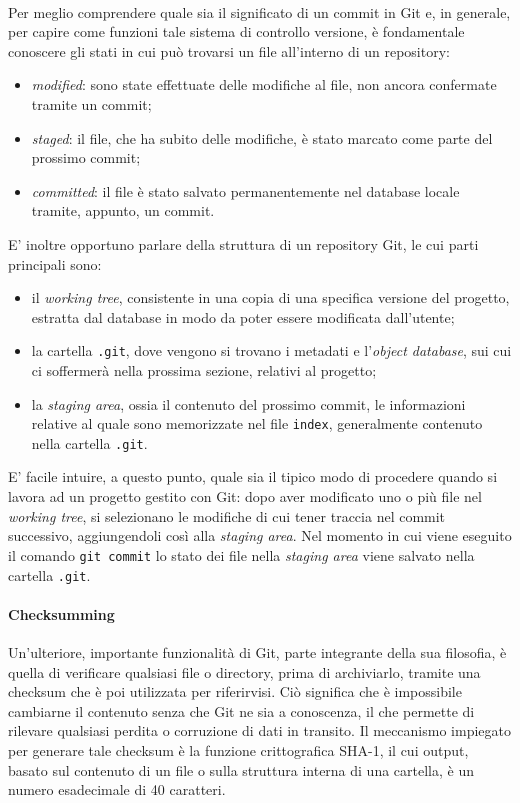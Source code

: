 \documentclass[12pt]{article}
\def\code#1{\texttt{#1}}
\begin{document}
\bigskip \\
Per meglio comprendere quale sia il significato di un commit in Git e, in generale, per capire come funzioni tale sistema di controllo versione, è fondamentale conoscere gli stati in cui può trovarsi un file all'interno di un repository:
\begin{itemize}
	\item \textit{modified}: sono state effettuate delle modifiche al file, non ancora confermate tramite un commit;
	\item \textit{staged}: il file, che ha subito delle modifiche, è stato marcato come parte del prossimo commit;
	\item \textit{committed}: il file è stato salvato permanentemente nel database locale tramite, appunto, un commit.
\end{itemize}
E' inoltre opportuno parlare della struttura di un repository Git, le cui parti principali sono:
\begin{itemize}
	\item il \textit{working tree}, consistente in una copia di una specifica versione del progetto, estratta dal database in modo da poter essere modificata dall'utente;
	\item la cartella \code{.git}, dove vengono si trovano i metadati e l'\textit{object database}, sui cui ci soffermerà nella prossima sezione, relativi al progetto;
	\item la \textit{staging area}, ossia il contenuto del prossimo commit, le informazioni relative al quale sono memorizzate nel file \code{index}, generalmente contenuto nella cartella \code{.git}. 
\end{itemize}
E' facile intuire, a questo punto, quale sia il tipico modo di procedere quando si lavora ad un progetto gestito con Git: dopo aver modificato uno o più file nel \textit{working tree}, si selezionano le modifiche di cui tener traccia nel commit successivo, aggiungendoli così alla \textit{staging area}. Nel momento in cui viene eseguito il comando \code{git commit} lo stato dei file nella \textit{staging area} viene salvato nella cartella \code{.git}.
\paragraph{Checksumming}
Un'ulteriore, importante funzionalità di Git, parte integrante della sua filosofia, è quella di verificare qualsiasi file o directory, prima di archiviarlo, tramite una checksum che è poi utilizzata per riferirvisi. Ciò significa che è impossibile cambiarne il contenuto senza che Git ne sia a conoscenza, il che permette di rilevare qualsiasi perdita o corruzione di dati in transito. 
Il meccanismo impiegato per generare tale checksum è la funzione crittografica SHA-1, il cui output, basato sul contenuto di un file o sulla struttura interna di una cartella, è un numero esadecimale di 40 caratteri.
\end{document}
